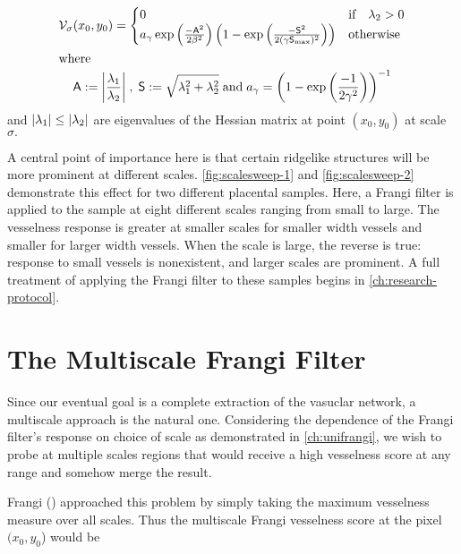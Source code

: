     \begin{gather} \label{eq:Vsigma}
    \Vsigma(x_0,y_0) = \begin{cases}
    0 & \text{if} \quad \lambda_2 > 0 \\
    a_\gamma \exp\left(\frac{-\Am^2}{2\beta^2}\right)
    \left(1 - \exp\left(\frac{-\Sm^2}{2(\gamma \Smax)^2}\right)\right) & \text{otherwise}
    \end{cases} \\
    \shortintertext{where}
    \Am := \abs*{\frac{\lambda_1}{\lambda_2}}
    \;,\;
    \Sm := \sqrt{\lambda_1^2 + \lambda_2^2}
    \;\textrm{and}\;
    a_\gamma = \left(1-\exp\left(\frac{-1}{2\gamma^2}\right)\right)^{-1} \notag\\
    \end{gather}
    and $\abs*{\lambda_1} \le \abs*{\lambda_2}$
    are eigenvalues of the Hessian matrix at point $(x_0, y_0)$ at scale $\sigma.$

    A central point of importance here is that certain ridgelike structures will be more prominent at different scales. \cref{fig:scalesweep-1} and \cref{fig:scalesweep-2} demonstrate this effect for two different placental samples. Here, a Frangi filter is applied to the sample at eight different scales ranging from small to large. The vesselness response is greater at smaller scales for smaller width vessels and smaller for larger width vessels. When the scale is large, the reverse is true: response to small vessels is nonexistent, and larger scales are prominent.  A full treatment of applying the Frangi filter to these samples begins in \cref{ch:research-protocol}.
    
    \section{The Multiscale Frangi Filter}
    Since our eventual goal is a complete extraction of the vasuclar network, a multiscale approach is the natural one. Considering the dependence of the Frangi filter's response on choice of scale as demonstrated in \cref{ch:unifrangi}, we wish to probe at multiple scales
   regions that would receive a high vesselness score at any range and somehow merge the result.
   
    Frangi (\citeyear{frangi-paper}) approached this problem by simply taking the maximum vesselness measure over all scales. Thus the multiscale Frangi vesselness score at the pixel $(x_0, y_0$) would be 
    
